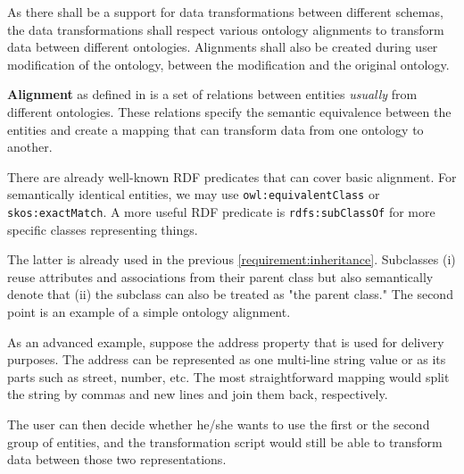 \begin{requirement}
    As there shall be a support for data transformations between different schemas, the data transformations shall respect various ontology alignments to transform data between different ontologies. Alignments shall also be created during user modification of the ontology, between the modification and the original ontology.
    \label{requirement:ontology-alignments}
\end{requirement}

\textbf{Alignment} as defined in \cite{euzenat_ontology_2013} is a set of relations between entities \textit{usually} from different ontologies. These relations specify the semantic equivalence between the entities and create a mapping that can transform data from one ontology to another.

There are already well-known RDF predicates that can cover basic alignment. For semantically identical entities, we may use \verb|owl:equivalentClass| or \verb|skos:exactMatch|. A more useful RDF predicate is \verb|rdfs:subClassOf| for more specific classes representing things.

The latter is already used in the previous \autoref{requirement:inheritance}. Subclasses (i) reuse attributes and associations from their parent class but also semantically denote that (ii) the subclass can also be treated as "the parent class." The second point is an example of a simple ontology alignment.

\medskip

As an advanced example, suppose the address property that is used for delivery purposes. The address can be represented as one multi-line string value or as its parts such as street, number, etc. The most straightforward mapping would split the string by commas and new lines and join them back, respectively.

The user can then decide whether he/she wants to use the first or the second group of entities, and the transformation script would still be able to transform data between those two representations.

